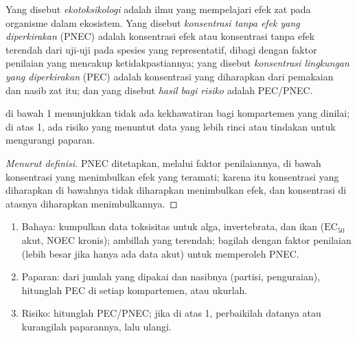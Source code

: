 \begin{definition}[Ekotoksikologi]\label{def:b3:environmental-toxicology:ecotoxicology}
Yang disebut \emph{ekotoksikologi} adalah ilmu yang mempelajari efek zat pada
organisme dalam ekosistem. Yang disebut \emph{konsentrasi tanpa efek yang
diperkirakan} (PNEC) adalah konsentrasi efek atau
konsentrasi tanpa efek terendah dari uji-uji pada spesies yang representatif,
dibagi dengan faktor penilaian yang mencakup ketidakpastiannya; yang disebut
\emph{konsentrasi lingkungan yang diperkirakan}
(PEC) adalah konsentrasi yang diharapkan dari pemakaian dan nasib
zat itu; dan yang disebut \emph{hasil bagi risiko} adalah PEC/PNEC.
\end{definition}

\begin{proposition}\label{prop:b3:environmental-toxicology:risk-quotient}
 di bawah 1 menunjukkan tidak ada kekhawatiran bagi kompartemen yang dinilai; di atas
1, ada risiko yang menuntut data yang lebih rinci atau tindakan untuk mengurangi paparan.
\end{proposition}

\begin{proof}[Menurut definisi]
PNEC ditetapkan, melalui faktor penilaiannya, di bawah konsentrasi yang
menimbulkan efek yang teramati; karena itu konsentrasi yang diharapkan di bawahnya tidak
diharapkan menimbulkan efek, dan konsentrasi di atasnya diharapkan menimbulkannya.
\end{proof}

\begin{method}\label{met:b3:environmental-toxicology:risk}
\begin{enumerate}
  \item Bahaya: kumpulkan data toksisitas untuk alga, invertebrata, dan ikan ($\mathrm{EC_{50}}$
        akut, NOEC kronis); ambillah yang terendah; bagilah dengan faktor penilaian (lebih besar jika
        hanya ada data akut) untuk memperoleh PNEC.
  \item Paparan: dari jumlah yang dipakai dan nasibnya (partisi, penguraian),
        hitunglah PEC di setiap kompartemen, atau ukurlah.
  \item Risiko: hitunglah PEC/PNEC; jika di atas 1, perbaikilah datanya atau kurangilah
        paparannya, lalu ulangi.
\end{enumerate}
\end{method}

